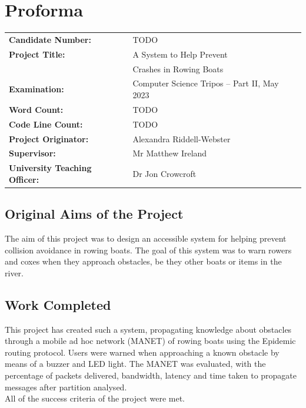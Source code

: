 \documentclass[12pt,a4paper]{report}
\begin{document}
\chapter*{Proforma}

{\large
\begin{tabular}{ll}
\bf Candidate Number:   & TODO \\
\bf Project Title:  & A System to Help Prevent \\
& Crashes in Rowing Boats \\
\bf Examination:  & Computer Science Tripos -- Part II, May 2023      \\
\bf Word Count:    & TODO \\ %
\bf Code Line Count:    & TODO \\ %
\bf Project Originator: & Alexandra Riddell-Webster                 \\
\bf Supervisor:         & Mr Matthew Ireland  \\ 
\bf University Teaching Officer:  & Dr Jon Crowcroft \\ 
\end{tabular}
}


\section*{Original Aims of the Project}
The aim of this project was to design an accessible system for helping prevent collision avoidance in rowing boats. The goal of this system was to warn rowers and coxes when they approach obstacles, be they other boats or items in the river. 

\section*{Work Completed}
This project has created such a system, propagating knowledge about obstacles through a mobile ad hoc network (MANET) of rowing boats using the Epidemic routing protocol. Users were warned when approaching a known obstacle by means of a buzzer and LED light. The MANET was evaluated, with the percentage of packets delivered, bandwidth, latency and time taken to propagate messages after partition analysed.  \\ 
All of the success criteria of the project were met. 
\end{document}
